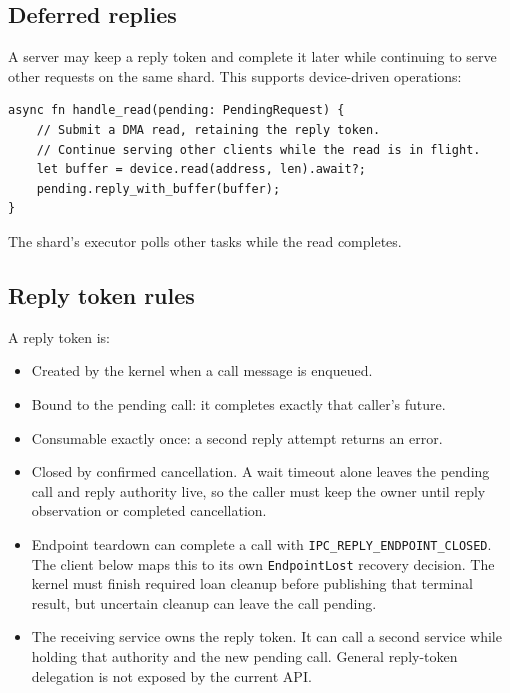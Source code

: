\subsection{Deferred replies}

A server may keep a reply token and complete it later while continuing to
serve other requests on the same shard. This supports device-driven
operations:


\begin{lstlisting}[style=rustCode]
async fn handle_read(pending: PendingRequest) {
    // Submit a DMA read, retaining the reply token.
    // Continue serving other clients while the read is in flight.
    let buffer = device.read(address, len).await?;
    pending.reply_with_buffer(buffer);
}
\end{lstlisting}

The shard's executor polls other tasks while the read completes.

\subsection{Reply token rules}

A reply token is:

\begin{itemize}
    \item Created by the kernel when a call message is enqueued.
    \item Bound to the pending call: it completes exactly that
        caller's future.
    \item Consumable exactly once: a second reply attempt returns
        an error.
    \item Closed by confirmed cancellation. A wait timeout alone leaves the
        pending call and reply authority live, so the caller must keep the owner
        until reply observation or completed cancellation.
    \item Endpoint teardown can complete a call with
        \texttt{IPC\_REPLY\_ENDPOINT\_CLOSED}. The client below maps this
        to its own \texttt{EndpointLost} recovery decision. The kernel
        must finish required loan cleanup before publishing that terminal result, but
        uncertain cleanup can leave the call pending.
    \item The receiving service owns the reply token. It can call a second
        service while holding that authority and the new pending call.
        General reply-token delegation is not exposed by the current API.
\end{itemize}

